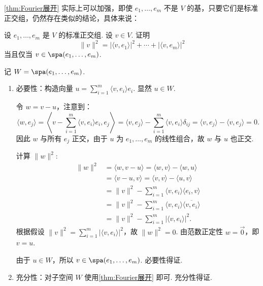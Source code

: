\autoref{thm:Fourier展开} 实际上可以加强，即使 $e_1, \ldots , e_m$ 不是 $ V $ 的基，只要它们是标准正交组，仍然存在类似的结论，具体来说：
\begin{example}{}{}
    设 $e_1, \ldots , e_m$ 是 $ V $ 的标准正交组. 设 $ v \in V $. 证明
    \[ \lVert v \rVert^2 = \lvert \langle v, e_1\rangle \rvert^2 + \cdots + \lvert \langle v, e_m\rangle \rvert^2 \]
    当且仅当 $ v \in \spa(e_1, \ldots , e_m)$.
\end{example}

\begin{solution}
    记 $W = \spa(e_1, \ldots , e_m)$.
    \begin{enumerate}
        \item 必要性：构造向量 $u = \displaystyle\sum_{i=1}^{m} \langle v, e_i \rangle e_i$. 显然 $u \in W$.

        令 $w = v - u$，注意到：
        \[
            \langle w, e_j \rangle = \left\langle v - \sum_{i=1}^{m} \langle v, e_i \rangle e_i, e_j \right\rangle = \langle v, e_j \rangle - \sum_{i=1}^{m} \langle v, e_i \rangle \delta_{ij} = \langle v, e_j \rangle - \langle v, e_j \rangle = 0.
        \]
        因此 $w$ 与所有 $e_j$ 正交，由于 $u$ 为 $e_1, \ldots , e_m$ 的线性组合，故 $w$ 与 $u$ 也正交.

        计算 $\lVert w \rVert^2$:
        \begin{align*}
            \|w\|^2 &= \langle w, v-u \rangle = \langle w, v \rangle - \langle w, u \rangle \\
            &= \langle v-u, v \rangle = \langle v, v \rangle - \langle u, v \rangle \\
            &= \|v\|^2 - \sum_{i=1}^{m} \langle v, e_i \rangle \langle e_i, v \rangle \\
            &= \|v\|^2 - \sum_{i=1}^{m} \langle v, e_i \rangle \overline{\langle v, e_i \rangle} \\
            &= \|v\|^2 - \sum_{i=1}^{m} |\langle v, e_i \rangle|^2.
        \end{align*}
        根据假设 $\lVert v \rVert^2 = \displaystyle\sum_{i=1}^{m} \lvert \langle v, e_i \rangle \rvert^2$，故 $\lVert w \rVert^2 = 0$.
        由范数正定性 $w = \vec{0}$，即 $v = u$.

        由于 $u \in W$，所以 $v \in \spa(e_1, \ldots , e_m)$. 必要性得证.

        \item 充分性：对子空间 $W$ 使用\autoref{thm:Fourier展开} 即可. 充分性得证.
    \end{enumerate}
\end{solution}

